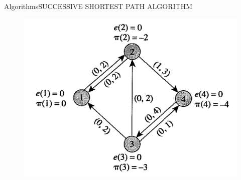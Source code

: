 \documentclass{beamer}
\begin{document}
\begin{frame}{Algorithms}{SUCCESSIVE SHORTEST PATH ALGORITHM}
\begin{figure}[h!t]
\centering
\includegraphics[scale = 0.5 ]{figra5succesive.png}
\end{figure}
\end{frame}
\end{document}

